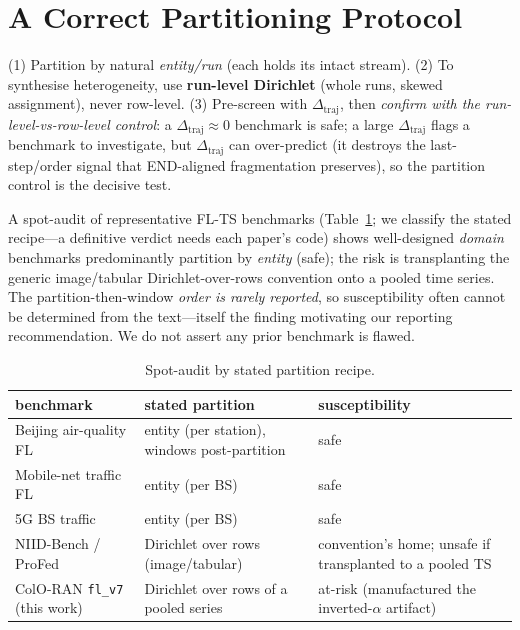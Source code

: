 \documentclass[conference]{IEEEtran}
\newcommand{\dtraj}{\Delta_{\mathrm{traj}}}
\newcommand{\code}[1]{\texttt{#1}}
\begin{document}
\section{A Correct Partitioning Protocol}\label{sec:protocol}
(1) Partition by natural \emph{entity/run} (each holds its intact stream). (2) To synthesise
heterogeneity, use \textbf{run-level Dirichlet} (whole runs, skewed assignment), never row-level. (3)
Pre-screen with $\dtraj$, then \emph{confirm with the run-level-vs-row-level control}: a $\dtraj\approx0$
benchmark is safe; a large $\dtraj$ flags a benchmark to investigate, but $\dtraj$ can over-predict (it
destroys the last-step/order signal that END-aligned fragmentation preserves), so the partition control is
the decisive test.

A spot-audit of representative FL-TS benchmarks (Table~\ref{tab:atrisk}; we classify the stated recipe---a
definitive verdict needs each paper's code) shows well-designed \emph{domain} benchmarks predominantly
partition by \emph{entity} (safe); the risk is transplanting the generic image/tabular Dirichlet-over-rows
convention onto a pooled time series. The partition-then-window \emph{order is rarely reported}, so
susceptibility often cannot be determined from the text---itself the finding motivating our reporting
recommendation. We do not assert any prior benchmark is flawed.

\begin{table}[t]\centering\caption{Spot-audit by stated partition recipe.}\label{tab:atrisk}
\begin{tabular}{p{3.0cm}p{1.95cm}p{2.25cm}}\toprule
benchmark & stated partition & susceptibility \\\midrule
Beijing air-quality FL~\cite{Hallak2025_FLForget} & entity (per station), windows post-partition & safe \\
Mobile-net traffic FL~\cite{Pavlidis2024_FLMobile} & entity (per BS) & safe \\
5G BS traffic~\cite{Perifanis2023_5GTraffic} & entity (per BS) & safe \\
NIID-Bench / ProFed~\cite{Li2022_NIIDBench,ProFed2025} & Dirichlet over rows (image/tabular) & convention's home; unsafe if transplanted to a pooled TS \\
ColO-RAN \code{fl\_v7} (this work) & Dirichlet over rows of a pooled series & at-risk (manufactured the inverted-$\alpha$ artifact) \\\bottomrule
\end{tabular}\end{table}
\end{document}
